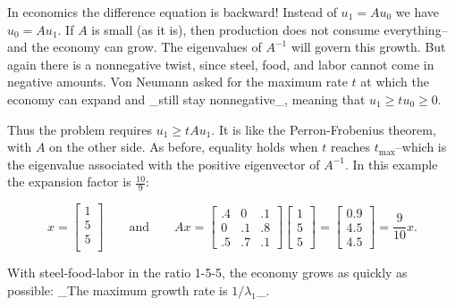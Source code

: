In economics the difference equation is backward! Instead of \(u_{1}=Au_{0}\) we have \(u_{0}=Au_{1}\). If \(A\) is small (as it is), then production does not consume everything--and the economy can grow. The eigenvalues of \(A^{-1}\) will govern this growth. But again there is a nonnegative twist, since steel, food, and labor cannot come in negative amounts. Von Neumann asked for the maximum rate \(t\) at which the economy can expand and _still stay nonnegative_, meaning that \(u_{1}\geq tu_{0}\geq 0\).

Thus the problem requires \(u_{1}\geq tAu_{1}\). It is like the Perron-Frobenius theorem, with \(A\) on the other side. As before, equality holds when \(t\) reaches \(t_{\max}\)--which is the eigenvalue associated with the positive eigenvector of \(A^{-1}\). In this example the expansion factor is \(\frac{10}{9}\):

\[x=\begin{bmatrix}1\\ 5\\ 5\\ \end{bmatrix}\qquad\text{and}\qquad Ax=\begin{bmatrix}.4&0&.1\\ 0&.1&.8\\ .5&.7&.1\end{bmatrix}\begin{bmatrix}1\\ 5\\ 5\end{bmatrix}=\begin{bmatrix}0.9\\ 4.5\\ 4.5\end{bmatrix}=\frac{9}{10}x.\]

With steel-food-labor in the ratio 1-5-5, the economy grows as quickly as possible: _The maximum growth rate is \(1/\lambda_{1}\)_.

 
